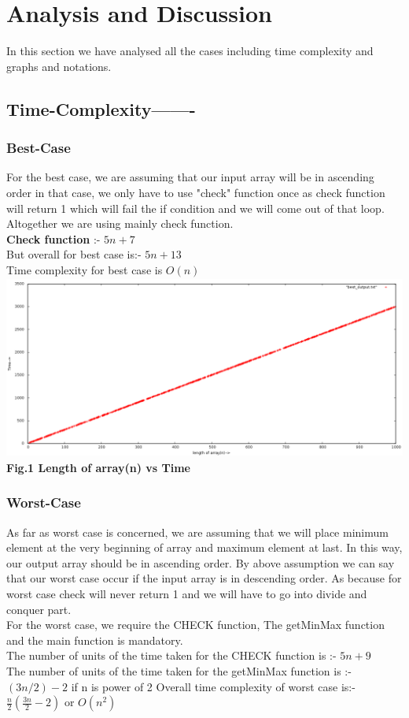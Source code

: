 \documentclass[conference]{IEEEtran}
\begin{document}
\section{\textbf{Analysis and Discussion}}
In this section we have analysed all the cases including  time complexity and  graphs and notations.
\subsection{\textbf{Time-Complexity-------}}
\subsubsection{\textbf{Best-Case}}
For the best case, we are assuming that our input array will be in ascending order in that case, we only have to use "check" function once as check function will return 1 which will fail the if condition and we will come out of that loop. Altogether we are using mainly check function.\\
\textbf{Check function} :- \textbf{$5n+7$}\\
But overall for best case is:- \textbf{$5n+13$}\\
Time complexity for best case is $O(n)$\\
\includegraphics[height =  6.00cm,width = \linewidth]{best.png}
\textbf{Fig.1 Length of array(n) vs  Time}
\subsubsection{\textbf{Worst-Case}}
As far as worst case is concerned, we are assuming that we will place minimum element at the very beginning of array and maximum element at last. In this way, our output array should be in ascending order. By above assumption we can say that our worst case occur if the input array is in descending order. As because for worst case check will never return 1 and we will have to go into divide and conquer part.\\
For the worst case, we require the CHECK function, The  getMinMax 
function and the main function is mandatory.\\
The number of units of the time taken for the CHECK function is :- $5n+9$\\
The number of units of the time taken for the getMinMax function is :- $(3n/2)-2$ if n is power of 2
Overall time complexity of worst case is:-  $\frac{n}{2}\left(\frac{3n}{2}-2\right)$ or $O(n^2)$
\end{document}

